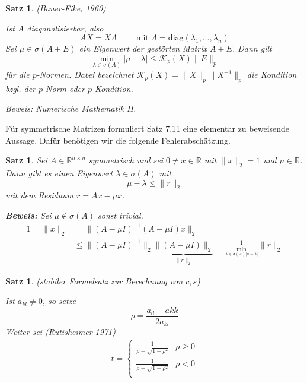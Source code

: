 \documentclass[%
a4paper,
11pt,		%
leqno,		%
]
{scrartcl}
\theoremstyle{plain}
\theoremstyle{plain}
\newtheorem{mysatz}[mydef]{Satz}
\theoremstyle{plain}
\theoremstyle{plain}
\begin{document}


\begin{mysatz} (Bauer-Fike, 1960)

Ist $A$ diagonalisierbar, also
\[
AX = X\Lambda \qquad \text{ mit } \Lambda = \text{diag}(\lambda_1,\dots,\lambda_n)
\]
Sei $\mu \in \sigma(A+E)$ ein Eigenwert der gestörten Matrix $A+E$. Dann gilt
\[
\min\limits_{\lambda \in \sigma(A)} |\mu - \lambda| \leq \mathcal{K}_p(X) \|E\|_p
\]
für die $p$-Normen. Dabei bezeichnet $\mathcal{K}_p(X) = \|X\|_p \|X^{-1}\|_p$ die Kondition bzgl. der $p$-Norm oder $p$-Kondition.

Beweis: Numerische Mathematik II.
\end{mysatz}

Für symmetrische Matrizen formuliert Satz 7.11 %
eine elementar zu beweisende Aussage. Dafür benötigen wir die folgende Fehlerabschätzung.

\begin{mysatz}
Sei $A \in \mathbb{R}^{n \times n}$ symmetrisch und sei $0 \neq x \in \mathbb{R}$ mit $\|x\|_2 = 1$ und $\mu \in \mathbb{R}$. Dann gibt es einen Eigenwert 
$\lambda \in \sigma(A)$ mit
\[
\mu - \lambda \leq \|r\|_2
\]
mit dem Residuum $r = Ax - \mu x$.

\textbf{Beweis:} Sei $\mu \notin \sigma(A)$ sonst trivial.
\begin{align*}
1 = \|x\|_2 & = \|(A -\mu I)^{-1} (A - \mu I)x \|_2 \\
 & \leq \|(A - \mu I)^{-1}\|_2 \underbrace{\|(A - \mu I)\|_2}_{\|r\|_2} = \frac{1}{\min\limits_{\lambda \in \sigma(A) |\mu - \lambda|}} \|r\|_2
\end{align*}
\end{mysatz}


\begin{mysatz}
(stabiler Formelsatz zur Berechnung von $c,s$)

Ist $a_{kl} \neq 0$, so setze
\[
\rho = \frac{a_{ll}-a{kk}}{2a_{kl}}
\]
Weiter sei (Rutisheimer 1971)
\begin{align*}
t = 
\begin{cases}
\frac{1}{\rho + \sqrt{1+\rho^2}} & \rho \geq 0\\
\frac{1}{\rho - \sqrt{1+\rho^2}} & \rho < 0\\
\end{cases}
\end{align*}
\end{mysatz}


\end{document}
